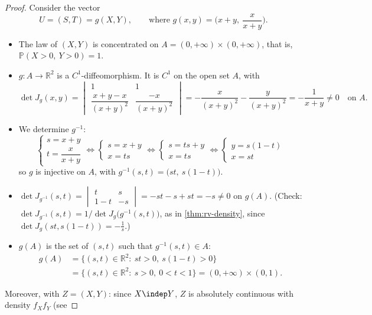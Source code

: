\begin{proof}
Consider the vector
\[
  U=(S,T)=g(X,Y),\qquad\text{where } g(x,y)=\Big(x+y,\ \frac x{x+y}\Big).
\]
\begin{itemize}
  \item The law of $(X,Y)$ is concentrated on $A=(0,+\infty)\times(0,+\infty)$, that is,
    $\mathbb P(X>0,\ Y>0)=1$.
  \item $g:A\to\mathbb R^2$ is a $C^1$-diffeomorphism. It is $C^1$ on the open set $A$, with
    \[
      \det J_g(x,y)=\begin{vmatrix}1&1\\[2pt]\dfrac{x+y-x}{(x+y)^2}&\dfrac{-x}{(x+y)^2}\end{vmatrix}
      =-\frac x{(x+y)^2}-\frac y{(x+y)^2}=-\frac1{x+y}\ne0\quad\text{on }A .
    \]
  \item We determine $g^{-1}$:
    \[
      \begin{cases}s=x+y\\[2pt] t=\dfrac x{x+y}\end{cases}\iff
      \begin{cases}s=x+y\\ x=ts\end{cases}\iff
      \begin{cases}s=ts+y\\ x=ts\end{cases}\iff
      \begin{cases}y=s(1-t)\\ x=st\end{cases}
    \]
    so $g$ is injective on $A$, with $g^{-1}(s,t)=\big(st,\ s(1-t)\big)$.
  \item $\det J_{g^{-1}}(s,t)=\begin{vmatrix}t&s\\1-t&-s\end{vmatrix}=-st-s+st=-s\ne0$ on $g(A)$.
    (Check: $\det J_{g^{-1}}(s,t)=1/\det J_g\big(g^{-1}(s,t)\big)$, as in \cref{thm:rv-density}, since
    $\det J_g(st,s(1-t))=-\frac1s$.)
  \item $g(A)$ is the set of $(s,t)$ such that $g^{-1}(s,t)\in A$:
    \[
    \begin{aligned}
      g(A)&=\big\{(s,t)\in\mathbb R^2:\ st>0,\ s(1-t)>0\big\}\\
      &=\big\{(s,t)\in\mathbb R^2:\ s>0,\ 0<t<1\big\}=(0,+\infty)\times(0,1).
    \end{aligned}
    \]
\end{itemize}
Moreover, with $Z=(X,Y)$: since $X\indep Y$, $Z$ is absolutely continuous with density $f_Xf_Y$ (see

\end{proof}
